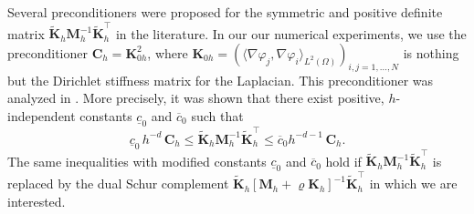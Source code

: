 \documentclass{article}
\numberwithin{equation}{section}
\begin{document}
Several preconditioners were proposed for the symmetric and positive
definite matrix
$\widetilde{\mathbf{K}}_h \mathbf{M}_h^{-1} \widetilde{\mathbf{K}}_h^\top$
in the literature. In our our numerical experiments, we use the preconditioner 
$\mathbf{C}_h = \mathbf{K}_{0h}^2$, where $\mathbf{K}_{0h} =
(\langle \nabla\varphi_j,  \nabla \varphi_i
\rangle_{L^2(\Omega)})_{i,j=1,\ldots,N}$ is nothing but the Dirichlet stiffness
matrix for the Laplacian. This preconditioner was analyzed in
\cite{BraessPeisker:1986IMAJNA,Langer1986NumerMath}. More precisely, it
was shown that there exist positive, $h$-independent constants
$\underline{c}_0$ and $\overline{c}_0$ such that
\begin{equation}\label{Eqn:SpectralEquivalenceInequalities2} 
  \underline{c}_0 \, h^{-d} \, \mathbf{C}_h
  \le \widetilde{\mathbf{K}}_h \mathbf{M}_h^{-1} \widetilde{\mathbf{K}}_h^\top
  \le \overline{c}_0 h^{-d-1} \, \mathbf{C}_h. 
\end{equation}
The same inequalities with modified constants $\underline{c}_0$ and
$\overline{c}_0$ hold if
$\widetilde{\mathbf{K}}_h \mathbf{M}_h^{-1} \widetilde{\mathbf{K}}_h^\top$
is replaced by the dual Schur complement 
$\widetilde{\mathbf{K}}_h [\mathbf{M}_h+\varrho \mathbf{K}_h]^{-1}
\widetilde{\mathbf{K}}_h^\top$ in which we are interested.
\end{document}
